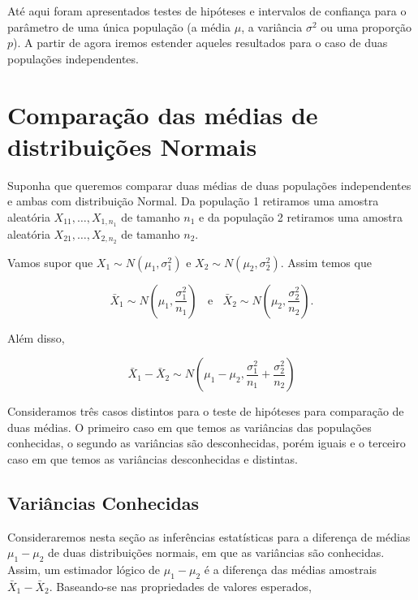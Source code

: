 \documentclass[
]{book}
\begin{document}
Até aqui foram apresentados testes de hipóteses e intervalos de confiança para o parâmetro de uma única população (a média \(\mu\), a variância \(\sigma^2\) ou uma proporção \(p\)). A partir de agora iremos estender aqueles resultados para o caso de duas populações independentes.

\hypertarget{comparauxe7uxe3o-das-muxe9dias-de-distribuiuxe7uxf5es-normais}{%
\section{Comparação das médias de distribuições Normais}\label{comparauxe7uxe3o-das-muxe9dias-de-distribuiuxe7uxf5es-normais}}

Suponha que queremos comparar duas médias de duas populações independentes e ambas com distribuição Normal. Da população 1 retiramos uma amostra aleatória \(X_{11},\ldots,X_{1,n_1}\) de tamanho \(n_1\) e da população 2 retiramos uma amostra aleatória \(X_{21},\ldots,X_{2,n_2}\) de tamanho \(n_2\).

Vamos supor que \(X_1\sim N\left(\mu_1,\sigma^2_1\right)\) e \(X_2\sim N\left(\mu_2,\sigma^2_2\right)\). Assim temos que

\[\bar X_1 \sim N\left(\mu_1,\frac{\sigma^2_1}{n_1}\right)~~~~\text{e}~~~~\bar X_2 \sim N\left(\mu_2,\frac{\sigma^2_2}{n_2}\right).\]

Além disso,

\[\bar X_1 - \bar X_2 \sim N\left(\mu_1-\mu_2,\frac{\sigma^2_1}{n_1}+\frac{\sigma^2_2}{n_2}\right)\]

Consideramos três casos distintos para o teste de hipóteses para comparação de duas médias. O primeiro caso em que temos as variâncias das populações conhecidas, o segundo as variâncias são desconhecidas, porém iguais e o terceiro caso em que temos as variâncias desconhecidas e distintas.

\hypertarget{variuxe2ncias-conhecidas}{%
\subsection{Variâncias Conhecidas}\label{variuxe2ncias-conhecidas}}

Consideraremos nesta seção as inferências estatísticas para a diferença de médias \(\mu_1-\mu_2\) de duas distribuições normais, em que as variâncias são conhecidas. Assim, um estimador lógico de \(\mu_1-\mu_2\) é a diferença das médias amostrais \(\bar X_1-\bar X_2\). Baseando-se nas propriedades de valores esperados,
\end{document}
